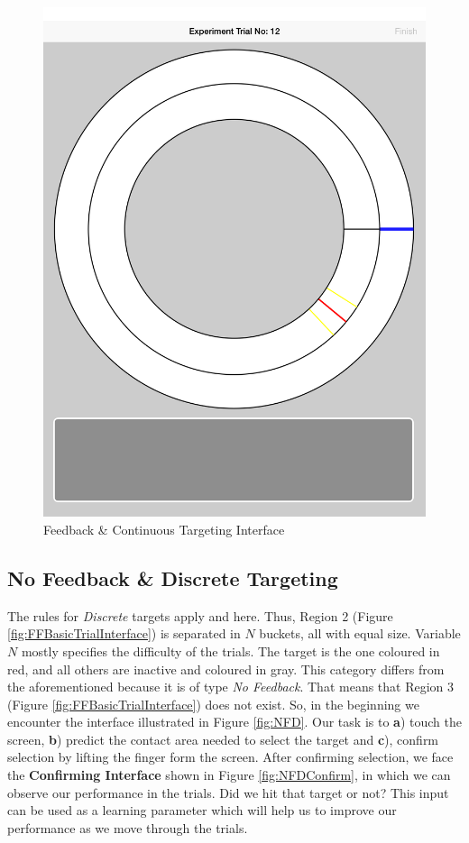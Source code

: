 \begin{figure}[H]
\centering
\includegraphics[scale=0.07]{figures/FND.png}
\caption{Feedback \& Continuous Targeting Interface}
\label{fig:FND}
\end{figure}

\subsection{No Feedback \& Discrete Targeting}

The rules for \emph{Discrete} targets apply and here. Thus, Region 2 (Figure \ref{fig:FFBasicTrialInterface}) is separated in $N$ buckets, all with equal size. Variable $N$ mostly specifies the difficulty of the trials. The target is the one coloured in red, and all others are inactive and coloured in gray. This category differs from the aforementioned because it is of type \emph{No Feedback}. That means that Region 3 (Figure \ref{fig:FFBasicTrialInterface}) does not exist. So, in the beginning we encounter the interface illustrated in Figure \ref{fig:NFD}. Our task  is to \textbf{a}) touch the screen, \textbf{b}) predict the contact area needed to select the target and \textbf{c}), confirm selection by lifting the finger form the screen. After confirming selection, we face the \textbf{Confirming Interface} shown in Figure \ref{fig:NFDConfirm}, in which we can observe our performance in the trials. Did we hit that target or not? This input can be used as a learning parameter which will help us to improve our performance as we move through the trials.

